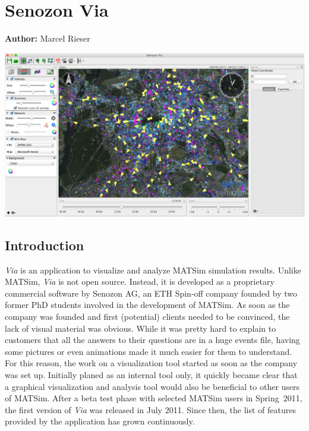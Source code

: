 \chapter{Senozon Via}
\label{ch:via}

\hfill \textbf{Author:} Marcel Rieser

\begin{center} \includegraphics[width=1.\textwidth, angle=0]{extending/figures/via/title.png} \end{center}


\def\Via{\emph{Via}}
\section{Introduction}
\Via{} is an application to visualize and analyze MATSim simulation results.
Unlike MATSim, \Via{} is not open source. 
Instead, it is developed as a proprietary commercial software
by Senozon AG, an ETH Spin-off company founded by two former PhD students
involved in the development of MATSim. As soon as the company was founded and
first (potential) clients needed to be convinced, the lack of visual material
was obvious. While it was pretty hard to explain to customers that all the
answers to their questions are in a huge events file, having some pictures or
even animations made it much easier for them to understand. For
this reason, the work on a visualization tool started as soon as the company
was set up. Initially planed as an internal tool only, it quickly became clear
that a graphical visualization and analysis tool would also be beneficial to
other users of MATSim. After a beta test phase with selected MATSim
users in Spring~2011, the first version of \Via{} was released in July
2011. Since then, the list of features provided by the application has grown
continuously.

